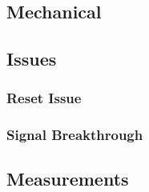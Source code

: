 \chapter{}

\section{Mechanical}

\section{Issues}

\subsection{ Reset Issue}

\subsection{Signal Breakthrough}


\section{Measurements}


\chapter{}

\chapter{}